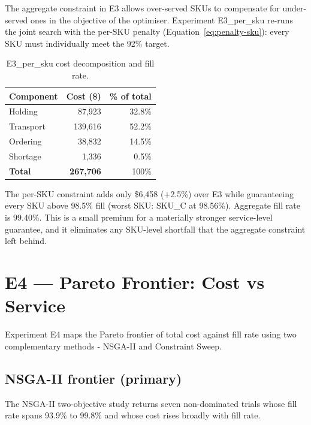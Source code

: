 The aggregate constraint in E3 allows over-served SKUs to compensate
for under-served ones in the objective of the optimiser.  Experiment E3\_per\_sku
re-runs the joint search with the per-SKU penalty
(Equation~\ref{eq:penalty-sku}): every SKU must individually meet the
92\% target.

\begin{table}[htbp]
  \centering
  \caption{E3\_per\_sku cost decomposition and fill rate.}
  \label{tab:e3-per-sku}
  \begin{tabular}{@{}lrr@{}}
    \toprule
    Component & Cost (\$) & \% of total \\
    \midrule
    Holding    &  87,923 & 32.8\% \\
    Transport  & 139,616 & 52.2\% \\
    Ordering   &  38,832 & 14.5\% \\
    Shortage   &   1,336 &  0.5\% \\
    \midrule
    \textbf{Total} & \textbf{267,706} & 100\% \\
    \bottomrule
  \end{tabular}
\end{table}

The per-SKU constraint adds only \$6,458 ($+$2.5\%) over E3 while
guaranteeing every SKU above 98.5\% fill (worst SKU: SKU\_C at 98.56\%).
Aggregate fill rate is 99.40\%.  This is a small premium for a
materially stronger service-level guarantee, and it eliminates any
SKU-level shortfall that the aggregate constraint left behind.

\section{E4 --- Pareto Frontier: Cost vs Service}
\label{sec:results:e4}

Experiment E4 maps the Pareto frontier of total cost against fill rate
using two complementary methods - NSGA-II and Constraint Sweep.

\subsection{NSGA-II frontier (primary)}

The NSGA-II two-objective study returns seven non-dominated trials whose
fill rate spans 93.9\% to 99.8\% and whose cost rises broadly with
fill rate.

